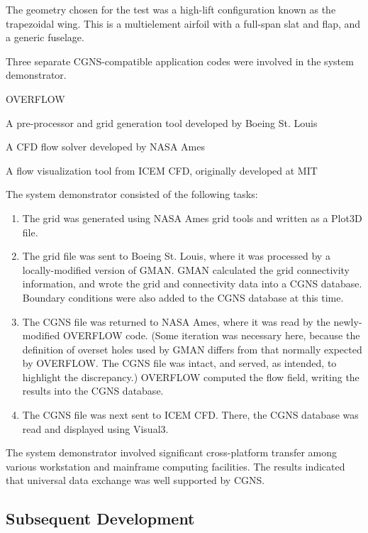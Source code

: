 The geometry chosen for the test was a high-lift configuration known as
the trapezoidal wing.
This is a multielement airfoil with a full-span slat and flap, and a
generic fuselage.

Three separate CGNS-compatible application codes were involved in the
system demonstrator.

\begin{Ventryic}{OVERFLOW}
\item [GMAN]
      A pre-processor and grid generation tool developed by Boeing
      St. Louis
\item [OVERFLOW]
      A CFD flow solver developed by NASA Ames
\item [Visual3]
      A flow visualization tool from ICEM CFD, originally developed at
      MIT
\end{Ventryic}

The system demonstrator consisted of the following tasks:

\begin{enumerate}
\item The grid was generated using NASA Ames grid tools and written
      as a Plot3D file.
\item The grid file was sent to Boeing St. Louis, where it was processed
      by a locally-modified version of GMAN.
      GMAN calculated the grid connectivity information, and wrote the
      grid and connectivity data into a CGNS database.
      Boundary conditions were also added to the CGNS database at this
      time.
\item The CGNS file was returned to NASA Ames, where it was read by the
      newly-modified OVERFLOW code.
      (Some iteration was necessary here, because the definition of
      overset holes used by GMAN differs from that normally expected by
      OVERFLOW.
      The CGNS file was intact, and served, as intended, to highlight the
      discrepancy.)
      OVERFLOW computed the flow field, writing the results into the
      CGNS database.
\item The CGNS file was next sent to ICEM CFD.
      There, the CGNS database was read and displayed using Visual3.
\end{enumerate}

The system demonstrator involved significant cross-platform transfer
among various workstation and mainframe computing facilities.
The results indicated that universal data exchange was well supported by
CGNS.

\subsection{Subsequent Development}

